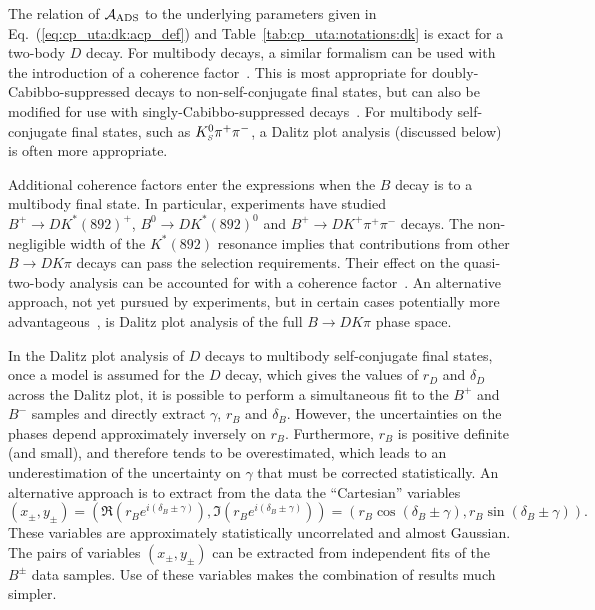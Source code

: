The relation of ${\cal A}_{\rm ADS}$ to the underlying parameters given in Eq.~(\ref{eq:cp_uta:dk:acp_def}) and Table~\ref{tab:cp_uta:notations:dk} is exact for a two-body $D$ decay.  
For multibody decays, a similar formalism can be used with the introduction of a coherence factor~\cite{Atwood:2003mj}.
This is most appropriate for doubly-Cabibbo-suppressed decays to non-self-conjugate final states, but can also be modified for use with singly-Cabibbo-suppressed decays~\cite{Grossman:2002aq}.
For multibody self-conjugate final states, such as $K^0_{\scriptscriptstyle S}\pi^+\pi^-$, a Dalitz plot analysis (discussed below) is often more appropriate.

Additional coherence factors enter the expressions when the $B$ decay is to a multibody final state.
In particular, experiments have studied $B^+ \to DK^*(892)^+$, $B^0 \to DK^*(892)^0$ and $B^+ \to DK^+\pi^+\pi^-$ decays.
The non-negligible width of the $K^*(892)$ resonance implies that contributions from other $B \to DK\pi$ decays can pass the selection requirements.
Their effect on the quasi-two-body analysis can be accounted for with a coherence factor~\cite{Gronau:2002mu}.
An alternative approach, not yet pursued by experiments, but in certain cases potentially more advantageous~\cite{Gershon:2008pe,Gershon:2009qc}, is Dalitz plot analysis of the full $B \to DK\pi$ phase space.

In the Dalitz plot analysis of $D$ decays to multibody self-conjugate final states,
once a model is assumed for the $D$ decay, 
which gives the values of $r_D$ and $\delta_D$ across the Dalitz plot,
it is possible to perform a simultaneous fit to the $B^+$ and $B^-$ samples 
and directly extract $\gamma$, $r_B$ and $\delta_B$.
However, the uncertainties on the phases depend approximately inversely on $r_B$.
Furthermore, $r_B$ is positive definite (and small), 
and therefore tends to be overestimated,
which leads to an underestimation of the uncertainty on $\gamma$ that must be
corrected statistically. %
An alternative approach is to extract from the data the ``Cartesian''
variables
\begin{equation}
  \left( x_\pm, y_\pm \right) = 
  \left( \Re(r_B e^{i(\delta_B\pm\gamma)}), \Im(r_B e^{i(\delta_B\pm\gamma)}) \right) = 
  \left( r_B \cos(\delta_B\pm\gamma), r_B \sin(\delta_B\pm\gamma) \right).
\end{equation}
These variables are approximately statistically uncorrelated and almost Gaussian.
The pairs of variables $\left( x_\pm, y_\pm \right)$ can be extracted
from independent fits of the $B^\pm$ data samples.
Use of these variables makes the combination of results much simpler.

